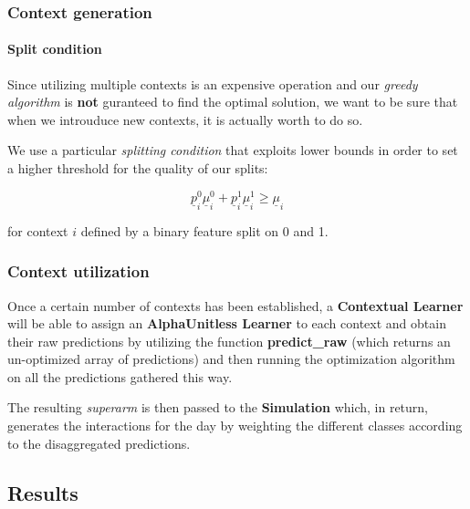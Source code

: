 \begin{frame}

\frametitle{Context generation}
\framesubtitle{Split condition}

Since utilizing multiple contexts is an expensive operation and our \textit{greedy algorithm} is \textbf{not} guranteed to find the optimal solution, we want to be sure that when we introuduce new contexts, it is actually worth to do so.

We use a particular \textit{splitting condition} that exploits lower bounds in order to set a higher threshold for the quality of our splits:

\begin{Large}
    \begin{displaymath}
        \underline{p}_i^0 \underline{\mu}_i^0 + \underline{p}_i^1 \underline{\mu}_i^1 \geq \underline{\mu}_i
    \end{displaymath}
\end{Large}

for context $i$ defined by a binary feature split on 0 and 1.

\end{frame}


\begin{frame}

\frametitle{Context utilization}

Once a certain number of contexts has been established, a \textbf{Contextual Learner} will be able to assign an \textbf{AlphaUnitless Learner} to each context and obtain their raw predictions by utilizing the function \textbf{predict\_raw} (which returns an un-optimized array of predictions) and then running the optimization algorithm on all the predictions gathered this way.

The resulting \textit{superarm} is then passed to the \textbf{Simulation} which, in return, generates the interactions for the day by weighting the different classes according to the disaggregated predictions.

\end{frame}


\subsection{Results}


